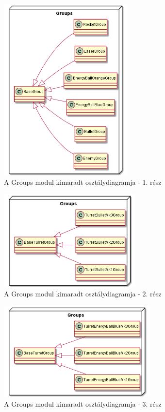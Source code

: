 \begin{figure}[h!]
	\centering
	\includegraphics[width=0.6\textwidth]{kepek/uml/groups/group-pt2.png}
	\caption{A Groups modul kimaradt osztálydiagramja - 1. rész}
	\label{fig:uml:group-pt2}
\end{figure}

\begin{figure}[h!]
	\centering
	\includegraphics[width=0.64\textwidth]{kepek/uml/groups/group-pt3.png}
	\caption{A Groups modul kimaradt osztálydiagramja - 2. rész}
	\label{fig:uml:group-pt3}
\end{figure}

\begin{figure}[h!]
	\centering
	\includegraphics[width=0.71\textwidth]{kepek/uml/groups/group-pt4.png}
	\caption{A Groups modul kimaradt osztálydiagramja - 3. rész}
	\label{fig:uml:group-pt4}
\end{figure}

